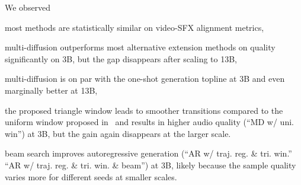 We observed
\begin{enumerate*}[label=(\arabic*)]
    \item most methods are statistically similar on video-SFX alignment metrics,
    \item multi-diffusion outperforms most alternative extension methods on quality significantly on 3B, but the gap disappears after scaling to 13B,
    \item multi-diffusion is on par with the one-shot generation topline at 3B and even marginally better at 13B,
    \item the proposed triangle window leads to smoother transitions compared to the uniform window proposed in~\citep{bar2023multidiffusion}
    and results in higher audio quality (\vs ``MD w/ uni. win'') at 3B, but the gain again disappears at the larger scale.
    \item beam search improves autoregressive generation (``AR w/ traj. reg. \& tri. win.'' \vs ``AR w/ traj. reg. \& tri. win. \& beam'') at 3B,
    likely because the sample quality varies more for different seeds at smaller scales.
\end{enumerate*}




